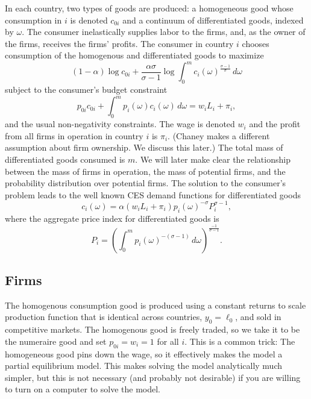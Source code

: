 \documentclass[11pt, pdftex]{article}
\begin{document}
In each country, two types of goods are produced: a homogeneous good whose consumption in $i$  is denoted $c_{0i}$  and a continuum of differentiated goods,  indexed by  $\omega$.  The consumer inelastically supplies labor to the firms, and, as the owner of the firms, receives the firms' profits.  The consumer in country $i$  chooses consumption of the homogenous and differentiated goods to maximize
\begin{equation}\label{eq:pref}
    (1-\alpha)\log c_{0i} + \frac{\alpha\sigma}{\sigma-1} \log \int_0^m c_i(\omega)^{\frac{\sigma-1}{\sigma}} \, d\omega
\end{equation}
subject to the consumer's budget constraint
\begin{equation}\label{eq:bc}
    p_{0i}c_{0i}+\int_0^m p_i(\omega)c_i(\omega)\, d\omega=w_iL_i+\pi_i,
\end{equation}
and the usual non-negativity constraints.  The wage is denoted $w_i$  and the profit from all firms in operation in country $i$ is  $\pi_i$. (Chaney makes a different assumption about firm ownership.  We discuss this later.)  The total mass of differentiated goods consumed is  $m$.  We will later make clear the relationship between the mass of firms in operation, the mass of potential firms, and the probability distribution over potential firms.
The solution to the consumer's problem leads to the well known CES demand functions for differentiated goods
\begin{equation}\label{eq:demand}
    c_i(\omega) = \alpha \left( w_iL_i+\pi_i \right) p_i(\omega)^{-\sigma}P_i^{\sigma-1},
\end{equation}
where the aggregate price index for differentiated goods is
\begin{equation}\label{eq:agg_P}
    P_i=\left(\int_0^m p_i(\omega)^{-(\sigma-1)}\,d\omega \right)^{\frac{-1}{\sigma-1}}.
\end{equation}
\subsection*{Firms}
The homogenous consumption good is produced using a constant returns to scale production function that is identical across countries, $y_0=\ell_0$, and sold in competitive markets.  The homogenous good is freely traded, so we take it to be the numeraire good and set $p_{0i}=w_i=1$  for all  $i$.  This is a common trick: The homogeneous good pins down the wage, so it effectively makes the model a partial equilibrium model.  This makes solving the model  analytically much simpler, but this is not necessary (and probably not desirable) if you are willing to turn on a computer to solve the model.
\end{document}
